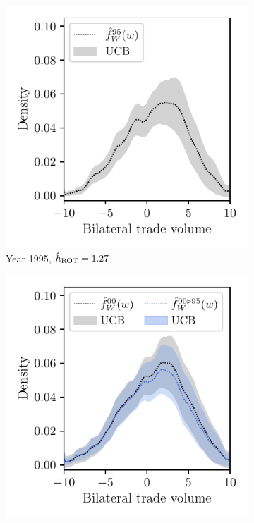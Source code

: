\begin{figure}[t]
  \centering
  \begin{subfigure}{0.32\textwidth}
    \centering
    \includegraphics[scale=0.64]{graphics/trade_plot_1995.pdf}
    \caption{Year 1995, $\hat h_{\operatorname{ROT}} = 1.27$.}
  \end{subfigure}
  \begin{subfigure}{0.32\textwidth}
    \centering
    \includegraphics[scale=0.64]{graphics/trade_plot_1995_2000.pdf}

\end{subfigure}
\end{figure}

